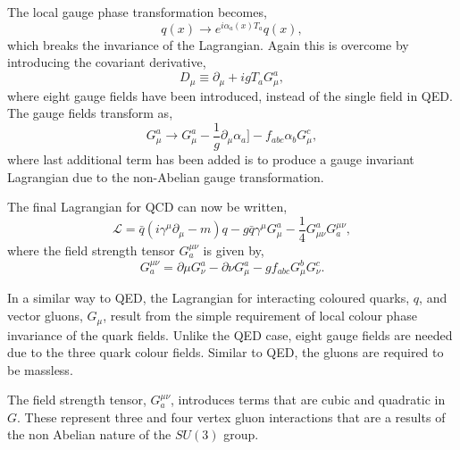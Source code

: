The local gauge phase transformation becomes,
\begin{equation}
q(x) \to e^{i\alpha_a(x)T_a} q(x),
\end{equation}
which breaks the invariance of the Lagrangian. Again this is overcome by
introducing the covariant derivative,
\begin{equation}
D_{\mu} \equiv \partial_{\mu} + i g T_{a} G_{\mu}^{a},
\end{equation}
where eight gauge fields have been introduced, instead of the single field in
QED.  
The gauge fields transform as,
\begin{equation}
 G_{\mu}^{a} \to G_{\mu}^{a} 
-\frac{1}{g}\partial_{\mu}\alpha_{a}]
-f_{abc}\alpha_{b}G^{c}_{\mu},
\end{equation}
where last additional term has been added is to produce a gauge invariant
Lagrangian due to the non-Abelian gauge transformation.

The final Lagrangian for QCD can now be written,
\begin{equation}
\mathcal{L} = 
\bar{q}(i\gamma^{\mu}\partial_{\mu} - m)q -
g \bar{q} \gamma^{\mu} G_{\mu}^{a} - 
\frac{1}{4} G_{\mu\nu}^{a} G^{\mu\nu}_{a},
\end{equation}
where the field strength tensor $G^{\mu\nu}_{a}$ is given by,
\begin{equation}
G^{\mu\nu}_{a} 
= \partial{\mu} G^{a}_{\nu}
- \partial{\nu} G^{a}_{\mu}
-g f_{abc} G^{b}_{\mu} G^{c}_{\nu}.
\end{equation}

In a similar way to QED, the Lagrangian for interacting coloured quarks, $q$, and
vector gluons, $G_{\mu}$, result from the simple requirement of local colour
phase invariance of the quark fields. Unlike the QED case, eight gauge fields
are needed due to the three quark colour fields.  Similar to QED, the gluons are
required to  be massless.

The field strength tensor, $G^{\mu\nu}_{a}$, introduces terms that are cubic and
quadratic in $G$. These represent three and four vertex gluon interactions that
are a results of the non Abelian nature of the $SU(3)$ group.


